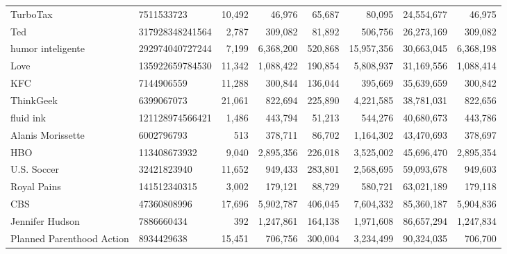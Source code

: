\begin{longtable}{llrrrrrr}
                                          TurboTax &       7511533723 &  10,492 &      46,976 &     65,687 &      80,095 &    24,554,677 &     46,975 \\
                                               Ted &  317928348241564 &   2,787 &     309,082 &     81,892 &     506,756 &    26,273,169 &    309,082 \\
                                 humor inteligente &  292974040727244 &   7,199 &   6,368,200 &    520,868 &  15,957,356 &    30,663,045 &  6,368,198 \\
                                              Love &  135922659784530 &  11,342 &   1,088,422 &    190,854 &   5,808,937 &    31,169,556 &  1,088,414 \\
                                               KFC &       7144906559 &  11,288 &     300,844 &    136,044 &     395,669 &    35,639,659 &    300,842 \\
                                         ThinkGeek &       6399067073 &  21,061 &     822,694 &    225,890 &   4,221,585 &    38,781,031 &    822,656 \\
                                         fluid ink &  121128974566421 &   1,486 &     443,794 &     51,213 &     544,276 &    40,680,673 &    443,786 \\
                                 Alanis Morissette &       6002796793 &     513 &     378,711 &     86,702 &   1,164,302 &    43,470,693 &    378,697 \\
                                               HBO &     113408673932 &   9,040 &   2,895,356 &    226,018 &   3,525,002 &    45,696,470 &  2,895,354 \\
                                       U.S. Soccer &      32421823940 &  11,652 &     949,433 &    283,801 &   2,568,695 &    59,093,678 &    949,603 \\
                                       Royal Pains &     141512340315 &   3,002 &     179,121 &     88,729 &     580,721 &    63,021,189 &    179,118 \\
                                               CBS &      47360808996 &  17,696 &   5,902,787 &    406,045 &   7,604,332 &    85,360,187 &  5,904,836 \\
                                   Jennifer Hudson &       7886660434 &     392 &   1,247,861 &    164,138 &   1,971,608 &    86,657,294 &  1,247,834 \\
                         Planned Parenthood Action &       8934429638 &  15,451 &     706,756 &    300,004 &   3,234,499 &    90,324,035 &    706,700 \\

\end{longtable}
